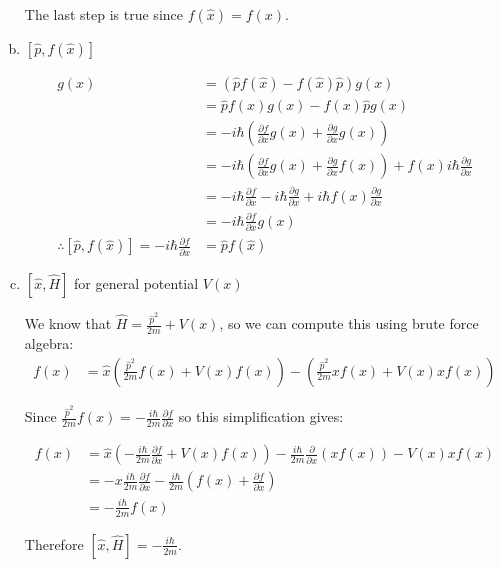 \documentclass[10pt]{article}
\begin{document}
\begin{enumerate}[(a)]
\begin{solution}
            The last step is true since $f(\hat x) = f(x)$.
        \end{solution}
        \item $[\hat p, f(\hat x)]$
        \begin{solution}
            \begin{align*}
                    [\hat p, f(\hat x)]g(x) &= \left(\hat p f(\hat x) - f(\hat x)\hat p\right)g(x)\\
                    &= \hat p f(x)g(x) - f(x) \hat pg(x)\\
                    &= -i\hbar\left(\frac{\partial f}{\partial x}g(x) + \frac{\partial g}{\partial x} g(x)\right)\\
                    &= -i\hbar\left(\frac{\partial f}{\partial x} g(x) + \frac{\partial g}{\partial x}f(x) \right) + f(x) i\hbar \frac{\partial g}{\partial x}\\
                    &= -i\hbar \frac{\partial f}{\partial x} - i\hbar \frac{\partial g}{\partial x} + i\hbar f(x) \frac{\partial g}{\partial x}\\
                    &= -i\hbar\frac{\partial f}{\partial x} g(x)\\
                    \therefore [\hat p, f(\hat x)] = -i\hbar \frac{\partial f}{\partial x} &= \hat p f(\hat x)
            \end{align*}

           
        \end{solution}
        \item $[\hat x, \hat H]$ for general potential $V(x)$
        
        \begin{solution}

            We know that $\hat H = \frac{\hat p^2}{2m} + V(x)$, so we can compute this using brute force algebra: 
            \begin{align*}
                [\hat x, \hat H]f(x) &= \hat x \left(\frac{\hat p^2}{2m} f(x) + V(x)f(x)\right) - \left(\frac{\hat p^2}{2m}xf(x) + V(x)xf(x)\right)
            \end{align*}

            Since $\frac{\hat p^2}{2m} f(x) = -\frac{i\hbar}{2m} \frac{\partial f}{\partial x}$ so this simplification gives:

            \begin{align*}
              [\hat x, \hat H]f(x)&= \hat x \left(-\frac{i\hbar}{2m} \frac{\partial f}{\partial x} + V(x)f(x)\right) - \frac{i\hbar}{2m} \frac{\partial}{\partial x}(xf(x)) - V(x) xf(x)\\
                &= -x\frac{i\hbar}{2m} \frac{\partial f}{\partial x} - \frac{i\hbar}{2m}\left(f(x) + \frac{\partial f}{\partial x}\right)\\
                &= -\frac{i\hbar}{2m} f(x)
            \end{align*}

            Therefore $[\hat x, \hat H] = -\frac{i\hbar}{2m}$.
        \end{solution}
    \end{enumerate}
\end{document}
